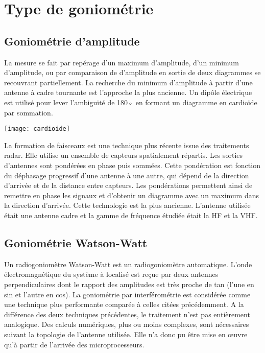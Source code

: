 \section{Type de goniométrie}

\subsection{Goniométrie d'amplitude}

	La mesure se fait par repérage d’un maximum d’amplitude, d’un minimum d’amplitude, ou par comparaison de d’amplitude en sortie de deux diagrammes se recouvrant partiellement. La recherche du minimum d’amplitude à partir d’une antenne à cadre tournante est l’approche la plus ancienne. Un dipôle électrique est utilisé pour lever l’ambiguïté de 180◦ en formant un diagramme en cardioïde par sommation.
	
\texttt{[image: cardioide]}
\parindent=15pt

	La formation de faisceaux est une technique plus récente issue des traitements radar. Elle utilise un ensemble de capteurs spatialement répartis. Les sorties d’antennes sont pondérées en phase puis sommées. Cette pondération est fonction du déphasage progressif d’une antenne à une autre, qui dépend de la direction d’arrivée et de la distance entre capteurs. Les pondérations permettent ainsi de remettre en phase les signaux et d’obtenir un diagramme avec un maximum dans la direction d’arrivée.
 Cette technologie est la plus ancienne. L’antenne utilisée était une antenne cadre et la gamme de fréquence étudiée était la HF et la VHF.

\subsection{Goniométrie Watson-Watt}

	Un radiogoniomètre Watson-Watt est un radiogoniomètre automatique. L’onde électromagnétique du système à localisé est reçue par deux antennes perpendiculaires dont le rapport des amplitudes est très proche de tan (l’une en sin et l’autre en cos). La goniométrie par interférométrie est considérée comme une technique plus performante comparée à celles citées précédemment. A la différence des deux techniques précédentes, le traitement n’est pas entièrement analogique. Des calculs numériques, plus ou moins complexes, sont nécessaires suivant la topologie de l’antenne utilisée. Elle n’a donc pu être mise en œuvre qu’à partir de l’arrivée des microprocesseurs.

